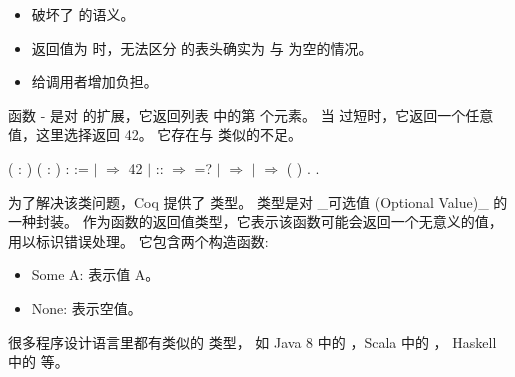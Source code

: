 \documentclass[12pt]{report}
\begin{document}
{{{\begin{itemize}
\item  破坏了  的语义。

\item  返回值为  时，无法区分  的表头确实为  
    与  为空的情况。

\item  给调用者增加负担。

\end{itemize}


  函数 - 是对  的扩展，它返回列表  中的第  个元素。
  当  过短时，它返回一个任意值，这里选择返回 42。
  它存在与  类似的不足。
\begin{coqdoccode}
\coqdocemptyline
\coqdocnoindent
{}  ( : ) ( : ) :  :=\coqdoceol
\coqdocindent{1.00em}
  \coqdoceol
\coqdocindent{1.00em}
\ensuremath{|}  \ensuremath{\Rightarrow} 42  \coqdoceol
\coqdocindent{1.00em}
\ensuremath{|}  ::  \ensuremath{\Rightarrow}   =?  \coqdoceol
\coqdocindent{7.50em}
\ensuremath{|}  \ensuremath{\Rightarrow} \coqdoceol
\coqdocindent{7.50em}
\ensuremath{|}  \ensuremath{\Rightarrow}   ( )\coqdoceol
\coqdocindent{7.50em}
\coqdoceol
\coqdocindent{1.00em}
.\coqdoceol
\coqdocemptyline
\coqdocnoindent
{} .\coqdoceol
\end{coqdoccode}
  为了解决该类问题，Coq 提供了  类型。
   类型是对 \_可选值 (Optional Value)\_ 的一种封装。
  作为函数的返回值类型，它表示该函数可能会返回一个无意义的值，
  用以标识错误处理。
  它包含两个构造函数:

\begin{itemize}
\item  Some A: 表示值 A。

\item  None: 表示空值。

\end{itemize}


  很多程序设计语言里都有类似的  类型，
  如 Java 8 中的 ，Scala 中的 ，
  Haskell 中的  等。


}}}
\end{document}
